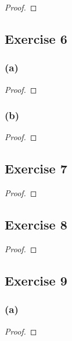 \documentclass[14pt]{extarticle}
\begin{document}
\begin{proof}

\end{proof}

\subsection{Exercise 6}

\subsubsection{(a)}

\begin{proof}

\end{proof}

\subsubsection{(b)}

\begin{proof}

\end{proof}

\subsection{Exercise 7}

\begin{proof}

\end{proof}

\subsection{Exercise 8}

\begin{proof}

\end{proof}

\subsection{Exercise 9}

\subsubsection{(a)}

\begin{proof}

\end{proof}
\end{document}
